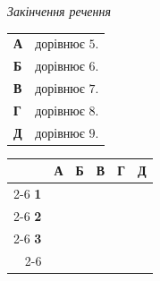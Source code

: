 \documentclass[14pt]{extarticle}
\begin{document}
\noindent
\begin{minipage}[t]{0.55\textwidth}
    \textit{Закінчення речення} \par \vspace{0.2cm}
    \begin{tabular}{ll}
    \textbf{А} & дорівнює $5$. \\
    \textbf{Б} & дорівнює $6$. \\
    \textbf{В} & дорівнює $7$. \\
    \textbf{Г} & дорівнює $8$. \\
    \textbf{Д} & дорівнює $9$. \\
    \end{tabular}
\end{minipage}%
\hfill
\begin{minipage}[t]{0.40\textwidth}
    \vspace{0.5cm}
    \begin{flushright}
    \begingroup
    \setlength{\tabcolsep}{4pt}
    \renewcommand{\arraystretch}{1.2}
    \small
    \begin{tabular}{r|c|c|c|c|c|}
         \multicolumn{1}{c}{} & \multicolumn{1}{c}{\textbf{А}} & \multicolumn{1}{c}{\textbf{Б}} & \multicolumn{1}{c}{\textbf{В}} & \multicolumn{1}{c}{\textbf{Г}} & \multicolumn{1}{c}{\textbf{Д}} \\ \cline{2-6}
         \textbf{1} & & & & & \\ \cline{2-6}
         \textbf{2} & & & & & \\ \cline{2-6}
         \textbf{3} & & & & & \\ \cline{2-6}
    \end{tabular}
    \endgroup
    \end{flushright}
\end{minipage}

\vspace{0.7cm}
\end{document}

